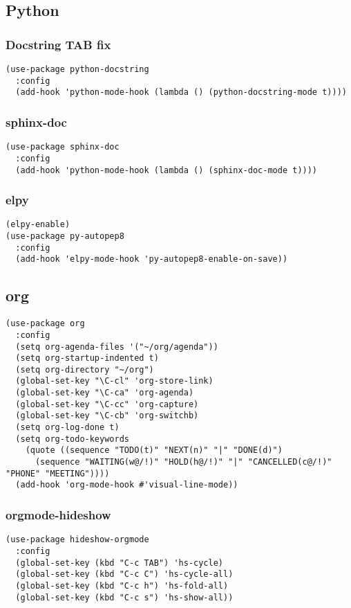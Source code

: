 \documentclass[11pt]{article}
\begin{document}
\subsection{Python}
\label{sec:org06aab28}
\subsubsection{Docstring TAB fix}
\label{sec:orgb084bec}
\begin{verbatim}
(use-package python-docstring
  :config
  (add-hook 'python-mode-hook (lambda () (python-docstring-mode t))))
\end{verbatim}
\subsubsection{sphinx-doc}
\label{sec:org6b3a243}
\begin{verbatim}
(use-package sphinx-doc
  :config
  (add-hook 'python-mode-hook (lambda () (sphinx-doc-mode t))))
\end{verbatim}
\subsubsection{elpy}
\label{sec:org484170a}
\begin{verbatim}
(elpy-enable)
(use-package py-autopep8
  :config
  (add-hook 'elpy-mode-hook 'py-autopep8-enable-on-save))
\end{verbatim}
\subsection{org}
\label{sec:org87938cf}
\begin{verbatim}
(use-package org
  :config
  (setq org-agenda-files '("~/org/agenda"))
  (setq org-startup-indented t)
  (setq org-directory "~/org")
  (global-set-key "\C-cl" 'org-store-link)
  (global-set-key "\C-ca" 'org-agenda)
  (global-set-key "\C-cc" 'org-capture)
  (global-set-key "\C-cb" 'org-switchb)
  (setq org-log-done t)
  (setq org-todo-keywords
    (quote ((sequence "TODO(t)" "NEXT(n)" "|" "DONE(d)")
      (sequence "WAITING(w@/!)" "HOLD(h@/!)" "|" "CANCELLED(c@/!)" "PHONE" "MEETING"))))
  (add-hook 'org-mode-hook #'visual-line-mode))
\end{verbatim}
\subsubsection{orgmode-hideshow}
\label{sec:orgad5458e}
\begin{verbatim}
(use-package hideshow-orgmode
  :config
  (global-set-key (kbd "C-c TAB") 'hs-cycle)
  (global-set-key (kbd "C-c C") 'hs-cycle-all)
  (global-set-key (kbd "C-c h") 'hs-fold-all)
  (global-set-key (kbd "C-c s") 'hs-show-all))
\end{verbatim}
\end{document}
